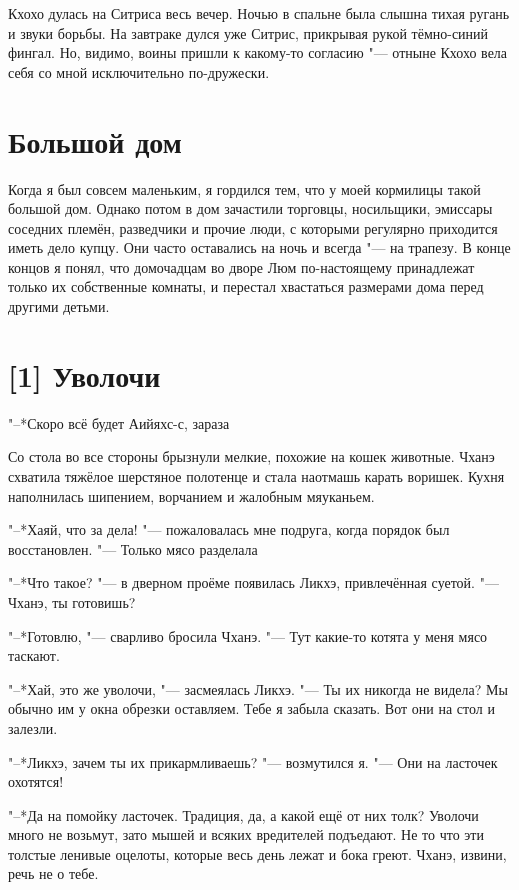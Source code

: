 Кхохо дулась на Ситриса весь вечер.
Ночью в спальне была слышна тихая ругань и звуки борьбы.
На завтраке дулся уже Ситрис, прикрывая рукой тёмно-синий фингал.
Но, видимо, воины пришли к какому-то согласию "--- отныне Кхохо вела себя со мной исключительно по-дружески.

\section{Большой дом}

Когда я был совсем маленьким, я гордился тем, что у моей кормилицы такой большой дом.
Однако потом в дом зачастили торговцы, носильщики, эмиссары соседних племён, разведчики и прочие люди, с которыми регулярно приходится иметь дело купцу.
Они часто оставались на ночь и всегда "--- на трапезу.
В конце концов я понял, что домочадцам во дворе Люм по-настоящему принадлежат только их собственные комнаты, и перестал хвастаться размерами дома перед другими детьми.

\section{[1] Уволочи}

"--*Скоро всё будет\ldotst
Аийяхс-с, зараза\ldotse

Со стола во все стороны брызнули мелкие, похожие на кошек животные.
Чханэ схватила тяжёлое шерстяное полотенце и стала наотмашь карать воришек.
Кухня наполнилась шипением, ворчанием и жалобным мяуканьем.

"--*Хаяй, что за дела! "--- пожаловалась мне подруга, когда порядок был восстановлен.
"--- Только мясо разделала\ldotse

"--*Что такое? "--- в дверном проёме появилась Ликхэ, привлечённая суетой.
"--- Чханэ, ты готовишь?

"--*Готовлю, "--- сварливо бросила Чханэ.
"--- Тут какие-то котята у меня мясо таскают.

"--*Хай, это же уволочи, "--- засмеялась Ликхэ.
"--- Ты их никогда не видела?
Мы обычно им у окна обрезки оставляем.
Тебе я забыла сказать.
Вот они на стол и залезли.

"--*Ликхэ, зачем ты их прикармливаешь? "--- возмутился я.
"--- Они на ласточек охотятся!

"--*Да на помойку ласточек.
Традиция, да, а какой ещё от них толк?
Уволочи много не возьмут, зато мышей и всяких вредителей подъедают.
Не то что эти толстые ленивые оцелоты, которые весь день лежат и бока греют.
Чханэ, извини, речь не о тебе.

